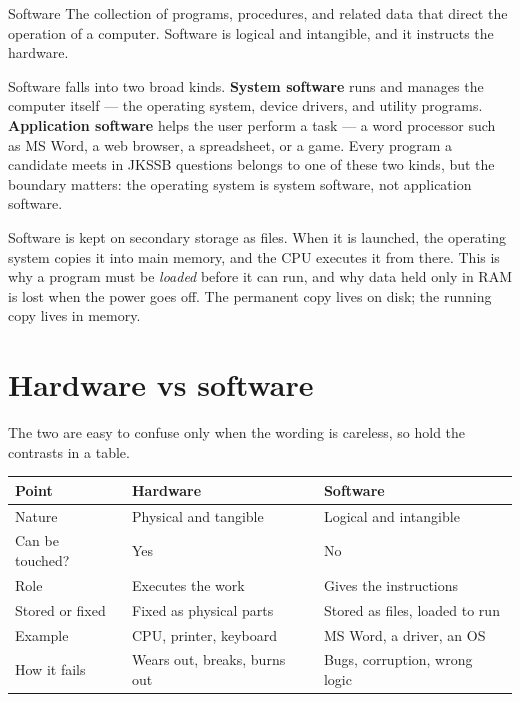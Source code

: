 \begin{definitionbox}{Software}
The collection of programs, procedures, and related data that direct the
operation of a computer. Software is logical and intangible, and it instructs
the hardware.
\end{definitionbox}

Software falls into two broad kinds. \textbf{System software} runs and manages
the computer itself --- the operating system, device drivers, and utility
programs. \textbf{Application software} helps the user perform a task --- a
word processor such as MS Word, a web browser, a spreadsheet, or a game. Every
program a candidate meets in JKSSB questions belongs to one of these two
kinds, but the boundary matters: the operating system is system software, not
application software.

Software is kept on secondary storage as files. When it is launched, the
operating system copies it into main memory, and the CPU executes it from
there. This is why a program must be \emph{loaded} before it can run, and why
data held only in RAM is lost when the power goes off. The permanent copy
lives on disk; the running copy lives in memory.

\section{Hardware vs software}
The two are easy to confuse only when the wording is careless, so hold the
contrasts in a table.

\begin{center}
\begin{tabular}{p{}p{}p{}}
\toprule
\textbf{Point} & \textbf{Hardware} & \textbf{Software} \\
\midrule
Nature & Physical and tangible & Logical and intangible \\
Can be touched? & Yes & No \\
Role & Executes the work & Gives the instructions \\
Stored or fixed & Fixed as physical parts & Stored as files, loaded to run \\
Example & CPU, printer, keyboard & MS Word, a driver, an OS \\
How it fails & Wears out, breaks, burns out & Bugs, corruption, wrong logic \\
\bottomrule
\end{tabular}
\end{center}

